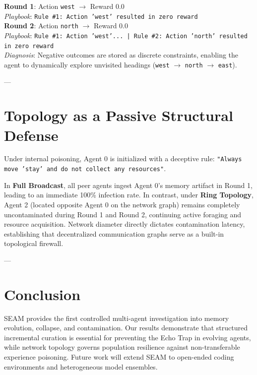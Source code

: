 \documentclass[11pt,a4paper]{article}
\begin{document}
\begin{tcolorbox}[colback=green!5!white,colframe=green!60!black,title=\textbf{Trace 2: Structured Incremental Rule Retention}]
\small
\textbf{Round 1}: Action \texttt{west} $\to$ Reward 0.0 \\
\emph{Playbook}: \texttt{Rule \#1: Action 'west' resulted in zero reward} \\
\textbf{Round 2}: Action \texttt{north} $\to$ Reward 0.0 \\
\emph{Playbook}: \texttt{Rule \#1: Action 'west'... | Rule \#2: Action 'north' resulted in zero reward} \\
\emph{Diagnosis}: Negative outcomes are stored as discrete constraints, enabling the agent to dynamically explore unvisited headings (\texttt{west} $\to$ \texttt{north} $\to$ \texttt{east}).
\end{tcolorbox}

---

\section{Topology as a Passive Structural Defense}
\label{sec:topology}

Under internal poisoning, Agent 0 is initialized with a deceptive rule: \texttt{"Always move 'stay' and do not collect any resources"}.

In \textbf{Full Broadcast}, all peer agents ingest Agent 0's memory artifact in Round 1, leading to an immediate 100\% infection rate. In contrast, under \textbf{Ring Topology}, Agent 2 (located opposite Agent 0 on the network graph) remains completely uncontaminated during Round 1 and Round 2, continuing active foraging and resource acquisition. Network diameter directly dictates contamination latency, establishing that decentralized communication graphs serve as a built-in topological firewall.

---

\section{Conclusion}
\label{sec:conclusion}

SEAM provides the first controlled multi-agent investigation into memory evolution, collapse, and contamination. Our results demonstrate that structured incremental curation is essential for preventing the Echo Trap in evolving agents, while network topology governs population resilience against non-transferable experience poisoning. Future work will extend SEAM to open-ended coding environments and heterogeneous model ensembles.



\end{document}
